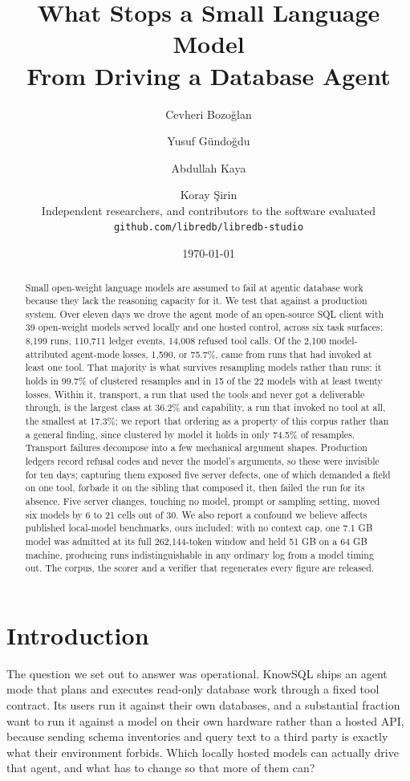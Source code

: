 \documentclass[11pt]{article}
\title{\bfseries What Stops a Small Language Model\\ From Driving a Database Agent}
\author{
  Cevheri Bozo\u{g}lan \and Yusuf G\"{u}ndo\u{g}du \and Abdullah Kaya \and Koray \c{S}irin\\[4pt]
  \normalsize Independent researchers, and contributors to the software evaluated\\
  \normalsize \texttt{github.com/libredb/libredb-studio}
}
\date{\today}
\begin{document}
\maketitle

\begin{abstract}
\noindent
Small open-weight language models are assumed to fail at agentic database work because they lack the reasoning
capacity for it. We test that against a production system. Over eleven days we drove the agent mode of an
open-source SQL client with 39 open-weight models served locally and one hosted control, across six task
surfaces: 8{,}199 runs, 110{,}711 ledger events, 14{,}008 refused tool calls. Of the 2{,}100 model-attributed
agent-mode losses, 1{,}590, or 75.7\%, came from runs that had invoked at least one tool. That majority is what
survives resampling models rather than runs: it holds in 99.7\% of clustered resamples and in 15 of the 22 models
with at least twenty losses. Within it, transport, a run that used the tools and never got a deliverable through,
is the largest class at 36.2\% and capability, a run that invoked no tool at all, the smallest at 17.3\%; we
report that ordering as a property of this corpus rather than a general finding, since clustered by model it
holds in only 74.5\% of resamples. Transport failures decompose into a few mechanical argument shapes. Production
ledgers record refusal codes and never the model's arguments, so these were invisible for ten days; capturing
them exposed five server defects, one of which demanded a field on one tool, forbade it on the sibling that
composed it, then failed the run for its absence. Five server changes, touching no model, prompt or sampling
setting, moved six models by 6 to 21 cells out of 30. We also report a confound we believe affects published
local-model benchmarks, ours included: with no context cap, one 7.1 GB model was admitted at its full
262{,}144-token window and held 51 GB on a 64 GB machine, producing runs indistinguishable in any ordinary log
from a model timing out. The corpus, the scorer and a verifier that regenerates every figure are released.
\end{abstract}

\section{Introduction}

The question we set out to answer was operational. KnowSQL ships an agent mode that plans and executes
read-only database work through a fixed tool contract. Its users run it against their own databases, and a
substantial fraction want to run it against a model on their own hardware rather than a hosted API, because
sending schema inventories and query text to a third party is exactly what their environment forbids. Which
locally hosted models can actually drive that agent, and what has to change so that more of them can?
\end{document}
